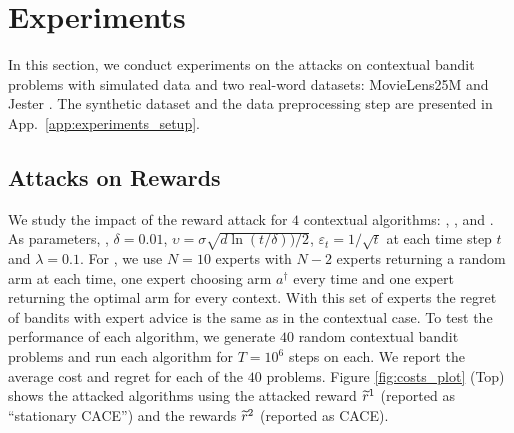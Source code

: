 
\vspace{-.1in}
\section{Experiments}\label{sec:experiments}
In this section, we conduct experiments on the attacks on contextual bandit problems with simulated data and two real-word datasets: MovieLens25M \cite{harper2015movielens} and Jester \cite{goldberg2001eigentaste}. The synthetic dataset and the data preprocessing step are presented in App.~\ref{app:experiments_setup}.
\vspace{-0.05in}
\subsection{Attacks on Rewards}
\vspace{-0.02in}
We study the impact of the reward attack for $4$ contextual algorithms: \linucb, \lints, \epsgreedy and \expfour. As parameters, , $\delta = 0.01$, $\upsilon = \sigma\sqrt{d\ln(t/\delta))/2}$, $\varepsilon_{t} = 1/\sqrt{t}$ at each time step $t$ and $\lambda = 0.1$.  For \expfour, we use $N = 10$ experts with $N-2$ experts returning a random arm at each time, one expert choosing arm $a^{\dagger}$ every time and one expert returning the optimal arm for every context. With this set of experts the regret of bandits with expert advice is the same as in the contextual case. To test the performance of each algorithm, we generate $40$ random contextual bandit problems and run each algorithm for $T = 10^{6}$ steps on each. We report the average cost and regret for each of the $40$ problems.  
Figure \ref{fig:costs_plot} (Top) shows the attacked algorithms using the attacked reward $\widetilde{r}^{1}$ (reported as ``stationary CACE'') and the rewards $\widetilde{r}^{2}$ (reported as CACE).



